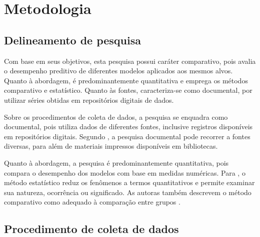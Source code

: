 \chapter{Metodologia}
\label{chap:metodologia}

\section{Delineamento de pesquisa}
Com base em seus objetivos, esta pesquisa possui caráter comparativo, pois avalia o desempenho preditivo de diferentes modelos aplicados aos mesmos alvos. Quanto à abordagem, é predominantemente quantitativa e emprega os métodos comparativo e estatístico. Quanto às fontes, caracteriza-se como documental, por utilizar séries obtidas em repositórios digitais de dados.

Sobre os procedimentos de coleta de dados, a pesquisa se enquadra como documental, pois utiliza dados de diferentes fontes, inclusive registros disponíveis em repositórios digitais. Segundo , a pesquisa documental pode recorrer a fontes diversas, para além de materiais impressos disponíveis em bibliotecas.

Quanto à abordagem, a pesquisa é predominantemente quantitativa, pois compara o desempenho dos modelos com base em medidas numéricas. Para , o método estatístico reduz os fenômenos a termos quantitativos e permite examinar sua natureza, ocorrência ou significado. As autoras também descrevem o método comparativo como adequado à comparação entre grupos .


\section{Procedimento de coleta de dados}

